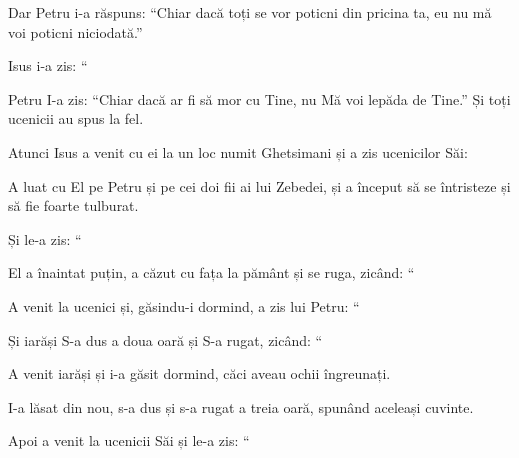 {\par }{\PP {}Dar Petru i-a răspuns: “Chiar dacă toți se vor poticni din pricina ta, eu nu mă voi poticni niciodată.”


\par }{\PP {}Isus i-a zis: “{}


\par }{\PP {}Petru I-a zis: “Chiar dacă ar fi să mor cu Tine, nu Mă voi lepăda de Tine.” Și toți ucenicii au spus la fel.


\par }{\PP {}Atunci Isus a venit cu ei la un loc numit Ghetsimani și a zis ucenicilor Săi:
{}

A luat cu El pe Petru și pe cei doi fii ai lui Zebedei, și a început să se întristeze și să fie foarte tulburat.

Și le-a zis: “{}


\par }{\PP {}El a înaintat puțin, a căzut cu fața la pământ și se ruga, zicând: “{}


\par }{\PP {}A venit la ucenici și, găsindu-i dormind, a zis lui Petru: “{}



\par }{\PP {}Și iarăși S-a dus a doua oară și S-a rugat, zicând: “{}


\par }{\PP {}A venit iarăși și i-a găsit dormind, căci aveau ochii îngreunați.

I-a lăsat din nou, s-a dus și s-a rugat a treia oară, spunând aceleași cuvinte.

Apoi a venit la ucenicii Săi și le-a zis: “{}

}

